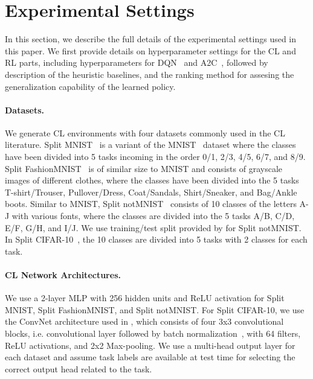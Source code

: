 
\section{Experimental Settings}\label{paperD:app:experimental_settings}

In this section, we describe the full details of the experimental settings used in this paper. We first provide details on hyperparameter settings for the CL and RL parts, including hyperparameters for DQN~ and A2C~, followed by description of the heuristic baselines, and the ranking method for assesing the generalization capability of the learned policy.  



\vspace{-3mm}
\paragraph{Datasets.}
We generate CL environments with four datasets commonly used in the CL literature. 
Split MNIST~ is a variant of the MNIST~ dataset where the classes have been divided into 5 tasks incoming in the order 0/1, 2/3, 4/5, 6/7, and 8/9. Split FashionMNIST~ is of similar size to MNIST and consists of grayscale images of different clothes, where the classes have been divided into the 5 tasks T-shirt/Trouser, Pullover/Dress, Coat/Sandals, Shirt/Sneaker, and Bag/Ankle boots. Similar to MNIST, Split notMNIST~ consists of 10 classes of the letters A-J with various fonts, where the classes are divided into the 5 tasks A/B, C/D, E/F, G/H, and I/J. We use training/test split provided by  for Split notMNIST. 
In Split CIFAR-10~, the 10 classes are divided into 5 tasks with 2 classes for each task. 

\vspace{-3mm}
\paragraph{CL Network Architectures.} We use a 2-layer MLP with 256 hidden units and ReLU activation for Split MNIST, Split FashionMNIST, and Split notMNIST. For Split CIFAR-10, we use the ConvNet architecture used in , which consists of four 3x3 convolutional blocks, i.e. convolutional layer followed by batch normalization~, with 64 filters, ReLU activations, and 2x2 Max-pooling. We use a multi-head output layer for each dataset and assume task labels are available at test time for selecting the correct output head related to the task. 

